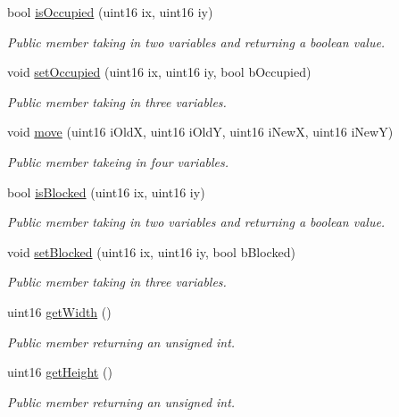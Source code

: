 \begin{DoxyCompactItemize}
bool \hyperlink{class_grid_afbfece3a3d96fa4e40316ad9cdf61c98}{is\+Occupied} (uint16 ix, uint16 iy)
\begin{DoxyCompactList}\small\item\em Public member taking in two variables and returning a boolean value. \end{DoxyCompactList}\item 
void \hyperlink{class_grid_a4142f2281cbb882c39514ffc3c2a59af}{set\+Occupied} (uint16 ix, uint16 iy, bool b\+Occupied)
\begin{DoxyCompactList}\small\item\em Public member taking in three variables. \end{DoxyCompactList}\item 
void \hyperlink{class_grid_af15e440bc92017e805740db43a09c034}{move} (uint16 i\+OldX, uint16 i\+OldY, uint16 i\+NewX, uint16 i\+NewY)
\begin{DoxyCompactList}\small\item\em Public member takeing in four variables. \end{DoxyCompactList}\item 
bool \hyperlink{class_grid_a8f12a73036cc2f155e20030dfae6b6f6}{is\+Blocked} (uint16 ix, uint16 iy)
\begin{DoxyCompactList}\small\item\em Public member taking in two variables and returning a boolean value. \end{DoxyCompactList}\item 
void \hyperlink{class_grid_a19e1e00ddf325821bc0c16de9f7799ed}{set\+Blocked} (uint16 ix, uint16 iy, bool b\+Blocked)
\begin{DoxyCompactList}\small\item\em Public member taking in three variables. \end{DoxyCompactList}\item 
uint16 \hyperlink{class_grid_ab03502a2a92f1890e5e453e5878c66db}{get\+Width} ()
\begin{DoxyCompactList}\small\item\em Public member returning an unsigned int. \end{DoxyCompactList}\item 
uint16 \hyperlink{class_grid_a374615638fd9e5f587d28486295952ef}{get\+Height} ()
\begin{DoxyCompactList}\small\item\em Public member returning an unsigned int. \end{DoxyCompactList}\end{DoxyCompactItemize}


